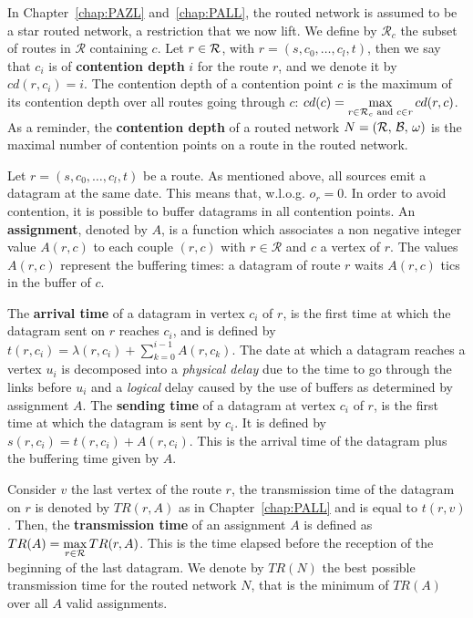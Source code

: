 In Chapter~\ref{chap:PAZL} and~\ref{chap:PALL}, the routed network is assumed to be a star routed network, a restriction that we now lift.
We define by $\mathcal{R}_c$ the subset of routes in $\mathcal{R}$ containing $c$. Let $r \in {\cal R}$, with $r = (s,c_0,\dots,c_l,t)$, then we say that $c_i$ is of \textbf{contention depth} $i$ for the route $r$, and we denote it by $cd(r,c_i) = i$. The contention depth of a contention point $c$ is the maximum of its contention depth over all routes going through $c$: $cd(c) = \max\limits_{r\in{\cal R}_c \text{ and } c \in r} cd(r,c)$. 
As a reminder, the \textbf{contention depth} of a routed network $N = ({\cal R},\,{\cal B},\,\omega)$ is the maximal number of contention points on a route in the routed network. 


   Let $r=(s,c_0,\dots,c_l,t)$ be a route. As mentioned above, all sources emit a datagram at the same date. This means that, w.l.o.g. $o_r = 0$. In order to avoid contention, it is possible to buffer datagrams in all contention points. An \textbf{assignment}, denoted by  $A$, is a function which associates a non negative integer value $A(r,c)$ to each couple $(r,c)$ with $r \in \mathcal{R}$ and $c$ a vertex of $r$. The values $A(r,c)$ represent the buffering times: a datagram of route $r$ waits $A(r,c)$ tics in the buffer of $c$.
          

 The \textbf{arrival time} of a datagram in vertex $c_i$ of $r$, is the first time at which the datagram sent on $r$ reaches $c_i$, and is defined by $t(r,c_i) = \lambda(r,c_i) + \sum_{k=0}^{i-1} A(r,c_k) $. The date at which a datagram reaches a vertex $u_i$ is decomposed into a \emph{physical delay} due to the time to go through the links before $u_i$ and a \emph{logical} delay caused by the use of buffers as determined by assignment $A$.
  The \textbf{sending time} of a datagram at vertex $c_i$ of $r$, is the first time at which the datagram is sent by $c_i$. It is defined by $s(r,c_i) = t(r,c_i) +  A(r,c_i) $. This is the arrival time of the datagram plus the buffering time given by $A$.
 
  Consider $v$ the last vertex of the route $r$, the transmission time of the datagram on 
  $r$ is denoted by $TR(r,A)$ as in Chapter~\ref{chap:PALL} and is equal to $t(r,v)$. Then, the \textbf{transmission time} of an assignment $A$ is defined as $TR(A) = \displaystyle \max\limits_{r \in {\cal R}} TR(r,A) $. This is the time elapsed before the reception of the beginning of the last datagram. We denote by $TR(N)$ the best possible transmission time for the routed network $N$, that is the minimum of $TR(A)$ over all $A$ valid assignments.

